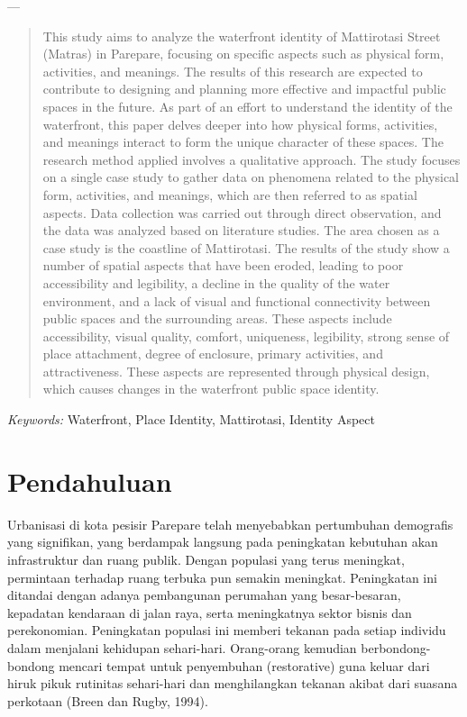 \documentclass[11pt]{simart} %
\begin{document}
---
\begin{abstract}
	This study aims to analyze the waterfront identity of Mattirotasi Street (Matras) in Parepare, focusing on specific aspects such as physical form, activities, and meanings. The results of this research are expected to contribute to designing and planning more effective and impactful public spaces in the future. As part of an effort to understand the identity of the waterfront, this paper delves deeper into how physical forms, activities, and meanings interact to form the unique character of these spaces. The research method applied involves a qualitative approach. The study focuses on a single case study to gather data on phenomena related to the physical form, activities, and meanings, which are then referred to as spatial aspects. Data collection was carried out through direct observation, and the data was analyzed based on literature studies. The area chosen as a case study is the coastline of Mattirotasi. The results of the study show a number of spatial aspects that have been eroded, leading to poor accessibility and legibility, a decline in the quality of the water environment, and a lack of visual and functional connectivity between public spaces and the surrounding areas. These aspects include accessibility, visual quality, comfort, uniqueness, legibility, strong sense of place attachment, degree of enclosure, primary activities, and attractiveness. These aspects are represented through physical design, which causes changes in the waterfront public space identity.
\end{abstract}

\hspace*{3.6mm}\textit{Keywords:} Waterfront, Place Identity, Mattirotasi, Identity Aspect %

\vspace{30pt} %

% 

\section{Pendahuluan}

Urbanisasi di kota pesisir Parepare telah menyebabkan pertumbuhan demografis yang signifikan, yang berdampak langsung pada peningkatan kebutuhan akan infrastruktur dan ruang publik. Dengan populasi yang terus meningkat, permintaan terhadap ruang terbuka pun semakin meningkat. Peningkatan ini ditandai dengan adanya pembangunan perumahan yang besar-besaran, kepadatan kendaraan di jalan raya, serta meningkatnya sektor bisnis dan perekonomian. Peningkatan populasi ini memberi tekanan pada setiap individu dalam menjalani kehidupan sehari-hari. Orang-orang kemudian berbondong-bondong mencari tempat untuk penyembuhan (restorative) guna keluar dari hiruk pikuk rutinitas sehari-hari dan menghilangkan tekanan akibat dari suasana perkotaan (Breen dan Rugby, 1994).
\end{document}
